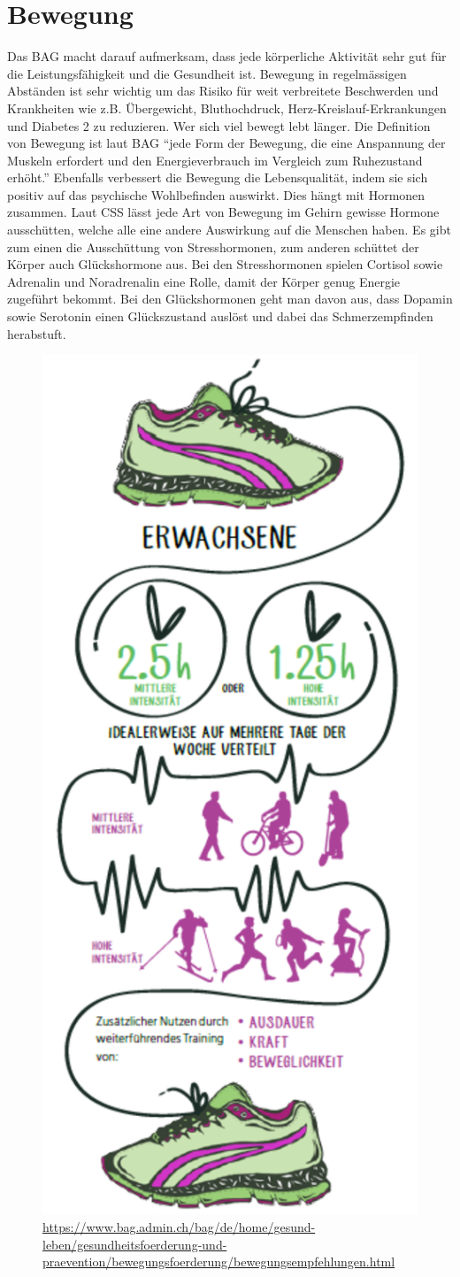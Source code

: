 \section{Bewegung}
Das BAG macht darauf aufmerksam, dass jede körperliche Aktivität sehr gut für die Leistungsfähigkeit und die Gesundheit ist. Bewegung in regelmässigen Abständen ist sehr wichtig um das Risiko für weit verbreitete Beschwerden und Krankheiten wie z.B. Übergewicht, Bluthochdruck, Herz-Kreislauf-Erkrankungen und Diabetes 2 zu reduzieren.
\newline
Wer sich viel bewegt lebt länger. Die Definition von Bewegung ist laut BAG “jede Form der Bewegung, die eine Anspannung der Muskeln erfordert und den Energieverbrauch im Vergleich zum Ruhezustand erhöht.”
\newline
Ebenfalls verbessert die Bewegung die Lebensqualität, indem sie sich positiv auf das psychische Wohlbefinden auswirkt. Dies hängt mit Hormonen zusammen. Laut CSS lässt jede Art von Bewegung im Gehirn gewisse Hormone ausschütten, welche alle eine andere Auswirkung auf die Menschen haben.\cite{hormone-bei-bewegung} Es gibt zum einen die Ausschüttung von Stresshormonen, zum anderen schüttet der Körper auch Glückshormone aus. Bei den Stresshormonen spielen Cortisol sowie Adrenalin und Noradrenalin eine Rolle, damit der Körper genug Energie zugeführt bekommt. Bei den Glückshormonen geht man davon aus, dass Dopamin sowie Serotonin einen Glückszustand auslöst und dabei das Schmerzempfinden herabstuft.
\begin{figure}[!ht]
  \centering
  \includegraphics[width=0.38\linewidth]{./images/bewegungsempfehlungen-ew-dt.png}
  \caption{Grafik von BAG zur Bewegungsempfehlung von Erwachsenen Menschen.}
  \label{fig:bewegungsempfehlungen}
  \caption*{\url{https://www.bag.admin.ch/bag/de/home/gesund-leben/gesundheitsfoerderung-und-praevention/bewegungsfoerderung/bewegungsempfehlungen.html}}
\end{figure}
